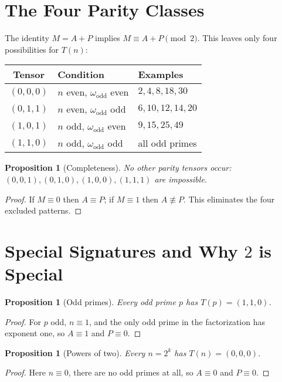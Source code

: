 \documentclass[11pt,a4paper]{article}
\numberwithin{equation}{section}
\numberwithin{figure}{section}
\numberwithin{table}{section}
\theoremstyle{plain}
\newtheorem{proposition}[theorem]{Proposition}
\theoremstyle{definition}
\theoremstyle{remark}
\begin{document}
\section{The Four Parity Classes}
The identity \(M=A+P\) implies \(M\equiv A+P\pmod 2\). This leaves only four possibilities for \(T(n)\):
\begin{center}
\begin{tabular}{c l l}
\toprule
Tensor & Condition & Examples \\
\midrule
\((0,0,0)\) & \(n\) even, \(\omega_{\mathrm{odd}}\) even & \(2, 4, 8, 18, 30\) \\
\((0,1,1)\) & \(n\) even, \(\omega_{\mathrm{odd}}\) odd  & \(6, 10, 12, 14, 20\) \\
\((1,0,1)\) & \(n\) odd, \(\omega_{\mathrm{odd}}\) even  & \(9, 15, 25, 49\) \\
\((1,1,0)\) & \(n\) odd, \(\omega_{\mathrm{odd}}\) odd   & all odd primes \\
\bottomrule
\end{tabular}
\end{center}

\begin{proposition}[Completeness]
No other parity tensors occur: \((0,0,1),(0,1,0),(1,0,0),(1,1,1)\) are impossible.
\end{proposition}
\begin{proof}
If \(M\equiv 0\) then \(A\equiv P\); if \(M\equiv 1\) then \(A\not\equiv P\). This eliminates the four excluded patterns.
\end{proof}

\section{Special Signatures and Why \texorpdfstring{$2$}{2} is Special}
\begin{proposition}[Odd primes]
Every odd prime \(p\) has \(T(p)=(1,1,0)\).
\end{proposition}
\begin{proof}
For \(p\) odd, \(n\equiv 1\), and the only odd prime in the factorization has exponent one, so \(A\equiv 1\) and \(P\equiv 0\).
\end{proof}

\begin{proposition}[Powers of two]
Every \(n=2^k\) has \(T(n)=(0,0,0)\).
\end{proposition}
\begin{proof}
Here \(n\equiv 0\), there are no odd primes at all, so \(A\equiv 0\) and \(P\equiv 0\).
\end{proof}
\end{document}
